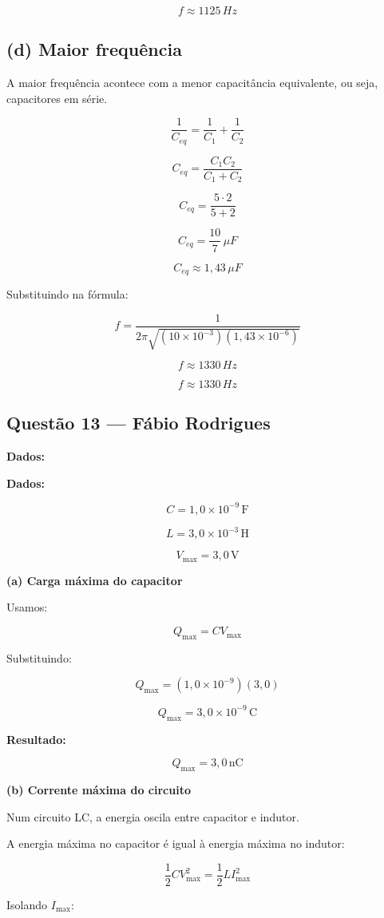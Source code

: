 \documentclass[12pt,a4paper]{article}
\begin{document}
\[
f\approx1125\,Hz
\]

\subsection*{(d) Maior frequência}

A maior frequência acontece com a menor capacitância equivalente, ou seja, capacitores em série.

\[
\frac{1}{C_{eq}}=\frac{1}{C_1}+\frac{1}{C_2}
\]

\[
C_{eq}=\frac{C_1C_2}{C_1+C_2}
\]

\[
C_{eq}=\frac{5\cdot2}{5+2}
\]

\[
C_{eq}=\frac{10}{7}\,\mu F
\]

\[
C_{eq}\approx1,43\,\mu F
\]

Substituindo na fórmula:

\[
f=\frac{1}{2\pi\sqrt{(10\times10^{-3})(1,43\times10^{-6})}}
\]

\[
f\approx1330\,Hz
\]

\[
f\approx1330\,Hz
\]
\subsection{Questão 13 — Fábio Rodrigues}
\textbf{Dados:}

\textbf{Dados:}

\[
C = 1,0 \times 10^{-9}\,\text{F}
\]

\[
L = 3,0 \times 10^{-3}\,\text{H}
\]

\[
V_{\max} = 3,0\,\text{V}
\]

\textbf{(a) Carga máxima do capacitor}

Usamos:

\[
Q_{\max} = CV_{\max}
\]

Substituindo:

\[
Q_{\max} = (1,0 \times 10^{-9})(3,0)
\]

\[
Q_{\max} = 3,0 \times 10^{-9}\,\text{C}
\]

\textbf{Resultado:}

\[
\boxed{Q_{\max} = 3,0\,\text{nC}}
\]

\textbf{(b) Corrente máxima do circuito}

Num circuito LC, a energia oscila entre capacitor e indutor.

A energia máxima no capacitor é igual à energia máxima no indutor:

\[
\frac{1}{2}CV_{\max}^{2} = \frac{1}{2}LI_{\max}^{2}
\]

Isolando \(I_{\max}\):
\end{document}
